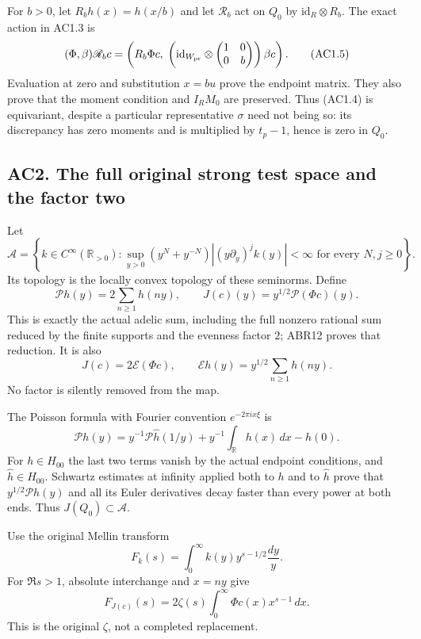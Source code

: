 For \(b>0\), let \(R_bh(x)=h(x/b)\) and let \(\mathscr R_b\) act on
\(Q_0\) by \(\mathrm{id}_R\otimes R_b\). The exact action in AC1.3 is \[
 (\Phi,\beta)\mathscr R_b c=
 \left(R_b\Phi c,\;
 \left(\mathrm{id}_{W_{\rm pr}}\otimes
 \begin{pmatrix}1&0\\0&b\end{pmatrix}\right)\beta c\right).
\tag{AC1.5}
\] Evaluation at zero and substitution \(x=bu\) prove the endpoint
matrix. They also prove that the moment condition and \(I_RM_0\) are
preserved. Thus (AC1.4) is equivariant, despite a particular
representative \(\sigma\) need not being so: its discrepancy has zero
moments and is multiplied by \(t_p-1\), hence is zero in \(Q_0\).

\subsection{AC2. The full original strong test space and the factor
two}\label{ac2.-the-full-original-strong-test-space-and-the-factor-two}

Let \[
 \mathcal A=\left\{k\in C^\infty(\mathbb R_{>0}):
 \sup_{y>0}(y^N+y^{-N})|(y\partial_y)^j k(y)|<\infty
 \text{ for every }N,j\geq0\right\}.
\tag{AC2.1}
\] Its topology is the locally convex topology of these seminorms.
Define \[
 \mathcal Ph(y)=2\sum_{n\geq1}h(ny),\qquad
 J(c)(y)=y^{1/2}\mathcal P(\Phi c)(y).
\tag{AC2.2}
\] This is exactly the actual adelic sum, including the full nonzero
rational sum reduced by the finite supports and the evenness factor
\(2\); ABR12 proves that reduction. It is also \[
 J(c)=2\mathcal E(\Phi c),\qquad
 \mathcal Eh(y)=y^{1/2}\sum_{n\geq1}h(ny).
\tag{AC2.3}
\] No factor is silently removed from the map.

The Poisson formula with Fourier convention \(e^{-2\pi ix\xi}\) is \[
 \mathcal Ph(y)=y^{-1}\mathcal P\widehat h(1/y)
 +y^{-1}\int_{\mathbb R}h(x)\,dx-h(0).
\tag{AC2.4}
\] For \(h\in H_{00}\) the last two terms vanish by the actual endpoint
conditions, and \(\widehat h\in H_{00}\). Schwartz estimates at infinity
applied both to \(h\) and to \(\widehat h\) prove that
\(y^{1/2}\mathcal Ph(y)\) and all its Euler derivatives decay faster
than every power at both ends. Thus \(J(Q_0)\subset\mathcal A\).

Use the original Mellin transform \[
 F_k(s)=\int_0^\infty k(y)y^{s-1/2}\frac{dy}{y}.
\tag{AC2.5}
\] For \(\Re s>1\), absolute interchange and \(x=ny\) give \[
 F_{J(c)}(s)=2\zeta(s)\int_0^\infty\Phi c(x)x^{s-1}\,dx .
\tag{AC2.6}
\] This is the original \(\zeta\), not a completed replacement.


